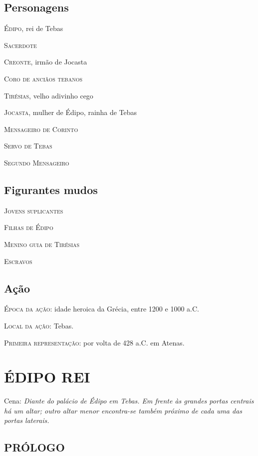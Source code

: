 
\section{Personagens}

\textsc{Édipo,} rei de Tebas

\textsc{Sacerdote}

\textsc{Creonte,} irmão de Jocasta

\textsc{Coro de anciãos tebanos}

\textsc{Tirésias,} velho adivinho cego

\textsc{Jocasta,} mulher de Édipo, rainha de Tebas

\textsc{Mensageiro de Corinto}

\textsc{Servo de Tebas}

\textsc{Segundo Mensageiro}


\section{Figurantes mudos} 

\textsc{Jovens suplicantes} 

\textsc{Filhas de Édipo}

\textsc{Menino guia de Tirésias}

\textsc{Escravos}



\section{Ação}

\textsc{Época da ação:} idade heroica da Grécia, entre 1200 e 1000 a.C.

\textsc{Local da ação:} Tebas.

\textsc{Primeira representação:} por volta de 428 a.C. em Atenas.


\clearpage

\chapter{ÉDIPO REI}

Cena: \emph{Diante do palácio de Édipo em Tebas. Em frente às grandes
portas centrais há um altar; outro altar menor encontra-se também
próximo de cada uma das portas laterais.}

\section{PRÓLOGO}

